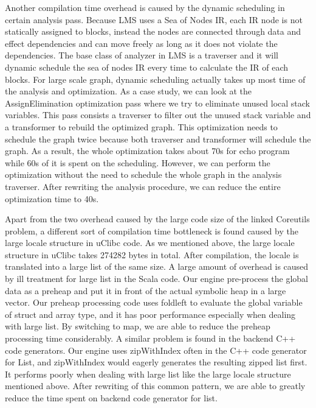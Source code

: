 \documentclass[sigplan, nonacm]{acmart}\settopmatter{printfolios=true,printccs=false,printacmref=false}
\begin{document}
Another compilation time overhead is caused by the dynamic scheduling in certain analysis pass. Because LMS uses a Sea of Nodes IR, each IR node is not statically assigned to blocks, instead the nodes are connected through data and effect dependencies and can move freely as long as it does not violate the dependencies. The base class of analyzer in LMS is a traverser and it will dynamic schedule the sea of nodes IR every time to calculate the IR of each blocks. For large scale graph, dynamic scheduling actually takes up most time of the analysis and optimization. As a case study, we can look at the AssignElimination optimization pass where we try to eliminate unused local stack variables. This pass consists a traverser to filter out the unused stack variable and a transformer to rebuild the optimized graph. This optimization needs to schedule the graph twice because both traverser and transformer will schedule the graph. As a result, the whole optimization takes about 70s for echo program while 60s of it is spent on the scheduling. However, we can perform the optimization without the need to schedule the whole graph in the analysis traverser. After rewriting the analysis procedure, we can reduce the entire optimization time to 40s. \par
Apart from the two overhead caused by the large code size of the linked Coreutils problem, a different sort of compilation time bottleneck is found caused by the large locale structure in uClibc code. As we mentioned above, the large locale structure in uClibc takes 274282 bytes in total. After compilation, the locale is translated into a large list of the same size. A large amount of overhead is caused by ill treatment for large list in the Scala code. Our engine pre-process the global data as a preheap and put it in front of the actual symbolic heap in a large vector. Our preheap processing code uses foldleft to evaluate the global variable of struct and array type, and it has poor performance especially when dealing with large list. By switching to map, we are able to reduce the preheap processing time considerably. A similar problem is found in the backend C++ code generators. Our engine uses zipWithIndex often in the C++ code generator for List, and zipWithIndex would eagerly generates the resulting zipped list first. It performs poorly when dealing with large list like the large locale structure mentioned above. After rewriting of this common pattern, we are able to greatly reduce the time spent on backend code generator for list.
\end{document}
